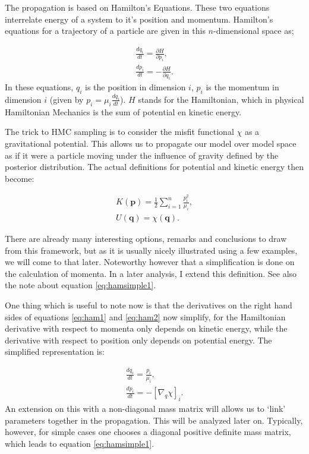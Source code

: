The propagation is based on Hamilton's Equations. These two equations interrelate energy of a system to it's position and momentum. Hamilton's equations for a trajectory of a particle are given in this $n$-dimensional space as;

\begin{gather}
	\frac{d q_i}{dt} = \frac{\partial H}{\partial p_i},\label{eq:ham1}\\
	\frac{d p_i}{dt} = - \frac{\partial H}{\partial q_i}\label{eq:ham2}.
\end{gather}
In these equations, $q_i$ is the position in dimension $i$, $p_i$ is the momentum in dimension $i$ (given by $p_i = \mu_i \frac{d q_i}{dt}$). $H$ stands for the Hamiltonian, which in physical Hamiltonian Mechanics is the sum of potential en kinetic energy.

The trick to \gls{HMC} sampling is to consider the misfit functional $\chi$ as a gravitational potential. This allows us to propagate our model over model space as if it were a particle moving under the influence of gravity defined by the posterior distribution. The actual definitions for potential and kinetic energy then become:

\begin{gather}
	K(\mathbf{p}) = \frac{1}{2} \sum_{i=1}^{n} \frac{p_i^2}{\mu_i},\label{eq:kineticsimple}\\
	U(\mathbf{q}) = \chi(\mathbf{q}).
\end{gather}

There are already many interesting options, remarks and conclusions to draw from this framework, but as it is usually nicely illustrated using a few examples, we will come to that later. Noteworthy however that a simplification is done on the calculation of momenta. In a later analysis, I extend this definition. See also the note about equation \eqref{eq:hamsimple1}.

One thing which is useful to note now is that the derivatives on the right hand sides of equations \eqref{eq:ham1} and \eqref{eq:ham2} now simplify, for the Hamiltonian derivative with respect to momenta only depends on kinetic energy, while the derivative with respect to position only depends on potential energy. The simplified representation is:

\begin{gather}
\frac{d q_i}{dt} = \frac{p_i}{\mu_i},\label{eq:hamsimple1}\\
\frac{d p_i}{dt} = - \left[\nabla_{q} \chi \right]_i\label{eq:hamsimple2}.
\end{gather}
An extension on this with a non-diagonal mass matrix will allows us to `link' parameters together in the propagation. This will be analyzed later on. Typically, however, for simple cases one chooses a diagonal positive definite mass matrix, which leads to equation \eqref{eq:hamsimple1}.


